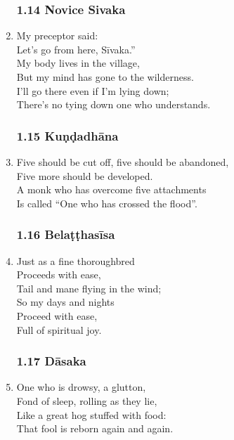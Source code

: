 \documentclass[10pt, openany]{book}
\newcommand*{\vleftofline}[1]{\leavevmode\llap{#1}}
\begin{document}
\begin{enumerate}
\subsubsection*{1.14 Novice Sivaka}

\item My preceptor said:\\
\vleftofline{“}Let’s go from here, Sīvaka.”\\
My body lives in the village,\\
But my mind has gone to the wilderness.\\
I’ll go there even if I’m lying down;\\
There’s no tying down one who understands.

\subsubsection*{1.15 Kuṇḍadhāna}

\item Five should be cut off, five should be abandoned,\\
Five more should be developed.\\
A monk who has overcome five attachments\\
Is called “One who has crossed the flood”.

\subsubsection*{1.16 Belaṭṭhasīsa}

\item Just as a fine thoroughbred\\
Proceeds with ease,\\
Tail and mane flying in the wind;\\
So my days and nights \\
Proceed with ease,\\
Full of spiritual joy.

\subsubsection*{1.17 Dāsaka}

\item One who is drowsy, a glutton,\\
Fond of sleep, rolling as they lie,\\
Like a great hog stuffed with food:\\
That fool is reborn again and again.


\end{enumerate}
\end{document}
